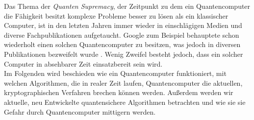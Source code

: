 Das Thema der \textit{Quanten Supremacy}, der Zeitpunkt zu dem ein Quantencomputer die Fähigkeit besitzt komplexe Probleme besser zu lösen als ein klassischer Computer, ist in den letzten Jahren immer wieder in einschlägigen Medien und diverse Fachpublikationen aufgetaucht. Google zum Beispiel behauptete schon wiederholt einen solchen Quantencomputer zu besitzen, was jedoch in diversen Publikationen bezweifelt wurde \cite{cho_ordinary_2022}. Wenig Zweifel besteht jedoch, dass ein solcher Computer in absehbarer Zeit einsatzbereit sein wird.\\ 
Im Folgenden wird beschieden wie ein Quantencomputer funktioniert, mit welchen Algorithmen, die in realer Zeit laufen, Quantencomputer die aktuellen, kryptographischen Verfahren brechen können werden. Außerdem werden wir aktuelle, neu Entwickelte quantensichere Algorithmen betrachten und wie sie sie Gefahr durch Quantencomputer mittigern werden.